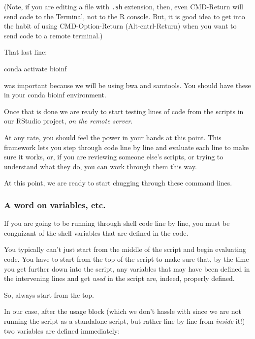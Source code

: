 \documentclass[]{krantz}
\makeatletter
\newenvironment{Shaded}{\begin{snugshade}}{\end{snugshade}}
\newcommand{\ExtensionTok}[1]{#1}
\newcommand{\NormalTok}[1]{#1}
\newenvironment{kframe}{%
\medskip{}
\setlength{\fboxsep}{.8em}
 \def\at@end@of@kframe{}%
 \ifinner\ifhmode%
  \def\at@end@of@kframe{\end{minipage}}%
  \begin{minipage}{\columnwidth}%
 \fi\fi%
 \def\FrameCommand##1{\hskip\@totalleftmargin \hskip-\fboxsep
 \colorbox{shadecolor}{##1}\hskip-\fboxsep
     \hskip-\linewidth \hskip-\@totalleftmargin \hskip\columnwidth}%
 \MakeFramed {\advance\hsize-\width
   \@totalleftmargin\z@ \linewidth\hsize
   \@setminipage}}%
 {\par\unskip\endMakeFramed%
 \at@end@of@kframe}
\renewenvironment{Shaded}{\begin{kframe}}{\end{kframe}}
\makeatother
\begin{document}
(Note, if you are editing a file with \texttt{.sh} extension, then, even CMD-Return
will send code to the Terminal, not to the R console. But, it is good idea to get
into the habit of using CMD-Option-Return (Alt-cntrl-Return) when you want to
send code to a remote terminal.)

That last line:

\begin{Shaded}
\begin{Highlighting}[]
\ExtensionTok{conda}\NormalTok{ activate bioinf}
\end{Highlighting}
\end{Shaded}

was important because we will be using bwa and samtools.
You should have these
in your conda bioinf environment.

Once that is done we are ready to start testing lines of code
from the scripts in our RStudio project, \emph{on the remote server}.

At any rate, you should feel the power in your hands at this point.
This framework lets you step through code line by line and evaluate
each line to make sure it works, or, if you are reviewing someone else's
scripts, or trying to understand what they do, you can work through them
this way.

At this point, we are ready to start chugging through these command lines.

\hypertarget{a-word-on-variables-etc.}{%
\subsubsection{A word on variables, etc.}\label{a-word-on-variables-etc.}}

If you are going to be running through shell code line by line, you
must be congnizant of the shell variables that are defined in the code.

You typically can't just start from the middle of the script and begin
evaluating code. You have to start from the top of the script to make sure
that, by the time you get further down into the script, any variables that
may have been defined in the intervening lines and get \emph{used} in the script are,
indeed, properly defined.

So, always start from the top.

In our case, after the usage block (which we don't hassle with since we
are not running the script as a standalone script, but rather line by line
from \emph{inside} it!) two variables are defined immediately:
\end{document}
